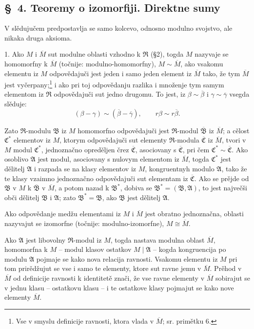 \documentclass[11pt]{article}
\providecommand{\mR}{\mathfrak{R}}
\providecommand{\mA}{\mathfrak{A}}
\providecommand{\mB}{\mathfrak{B}}
\providecommand{\mC}{\mathfrak{C}}
\begin{document}
\setcounter{footnote}{14}

\subsection*{\S~4. Teoremy o izomorfiji. Direktne sumy}

V slědujučem predpostavlja se samo kolcevo, odnosno modulno svojstvo, ale nikaka druga aksioma.

1. Ako $M$ i $\overline M$ sut modulne oblasti vzhodno k $\mR$ (§2), togda $M$ nazyvaje se homomorfny k $\overline M$ (točnije: modulno-homomorfny), $M\sim\overline M$, ako vsakomu elementu iz $M$ odpovědajuči jest jeden i samo jeden element iz $\overline M$ tako, že tym $\overline M$ jest vyčerpany;\footnote{Vse v smyslu definicije ravnosti, ktora vlada v $\overline M$; sr. primětku 6.} i ako pri toj odpovědanju razlika i množenje tym samym elementom iz $\mR$ odpovědajuči sut jedno drugomu. To jest, iz $\beta\sim\overline\beta$ i $\gamma\sim\overline\gamma$ vsegda slěduje:
\[
(\beta-\gamma)\sim(\overline\beta-\overline\gamma),\qquad r\beta\sim r\overline\beta .
\]

Zato $\mR$-modulu $\mB$ iz $M$ homomorfno odpovědajuči jest $\mR$-modul $\overline{\mB}$ iz $\overline M$; a cělost $\mC^*$ elementov iz $M$, ktorym odpovědajuči sut elementy $\mR$-modula $\overline{\mC}$ iz $\overline M$, tvori v $M$ modul $\mC^*$, jednoznačno opreděljen črez $\overline{\mC}$, asociovany s $\overline{\mC}$, pri čem $\mC^*\sim\overline{\mC}$. Ako osoblivo $\mA$ jest modul, asociovany s nulovym elementom iz $\overline M$, togda $\mC^*$ jest dělitelj $\mA$ i razpada se na klasy elementov iz $M$, kongruentnyh modulo $\mA$, tako že te klasy vzaimno jednoznačno odpovědajuči sut elementam iz $\overline{\mC}$. Ako se prějde od $\mB$ v $M$ k $\overline{\mB}$ v $\overline M$, a potom nazad k $\mB^*$, dobiva se $\mB^*=(\mB,\mA)$, to jest največši obči dělitelj $\mB$ i $\mA$; zato $\mB^*=\mB$, ako $\mB$ jest dělitelj $\mA$.

Ako odpovědanje medžu elementami iz $M$ i $\overline M$ jest obratno jednoznačna, oblasti nazyvajut se izomorfne (točnije: modulno-izomorfne), $M\cong\overline M$.

Ako $\mA$ jest libovolny $\mR$-modul iz $M$, togda nastava modulna oblast $\overline M$, homomorfna k $M$ -- modul klasov ostatkov $M\mid\mA$ -- kogda kongruencija po modulu $\mA$ pojmaje se kako nova relacija ravnosti. Vsakomu elementu iz $M$ pri tom prirědžujut se vse i samo te elementy, ktore sut ravne jemu v $\overline M$. Prěhod v $\overline M$ od definicije ravnosti k identitetě znači, že vse ravne elementy v $\overline M$ sobirajut se v jednu klasu -- ostatkovu klasu -- i te ostatkove klasy pojmajut se kako nove elementy $\overline M$.
\end{document}
